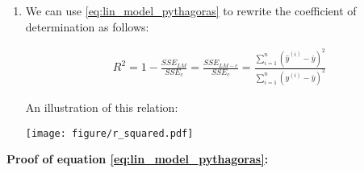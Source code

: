 {\begin{enumerate}[1.]
This basically means that the model predictions \(\hat{y}_i\) and the residuals \( (y_i - \hat{y}_i) \) are uncorrelated.
(The two vectors are "orthogonal" to each other.)
A proof for formula \eqref{eq:lin_model_pythagoras} is given below.

\item
We can use \eqref{eq:lin_model_pythagoras} to rewrite the coefficient of determination as follows:

\begin{align*}
    R^2 = 1-\frac{SSE_{LM}}{SSE_{c}} = \frac{SSE_{LM-c}}{SSE_{c}} = \frac{\sum_{i=1}^n (\hat{y}^{(i)} - \bar{y})^2}{\sum_{i=1}^n (y^{(i)} - \bar{y})^2}
\end{align*}


An illustration of this relation:

\begin{center}
	\texttt{[image: figure/r\_squared.pdf]}
\end{center}

\end{enumerate}


\textbf{Proof of equation \eqref{eq:lin_model_pythagoras}:}

}
